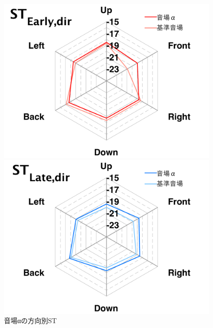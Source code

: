 \documentclass[11pt,a4j]{jreport}
\begin{document}
\begin{figure}[H]
  \begin{minipage}[b]{.5\linewidth}
    \centering
    \includegraphics[width=1\linewidth]{images/experimentField/withLegend/01alphaOnBaseEarly.pdf}
  \end{minipage}%
  \begin{minipage}[b]{.5\linewidth}
    \centering
    \includegraphics[width=1\linewidth]{images/experimentField/withLegend/05alphaOnBaseLate.pdf}
  \end{minipage}
  \caption{音場αの方向別ST}
  \label{fig:音場αの方向別ST}
\end{figure}
\end{document}
